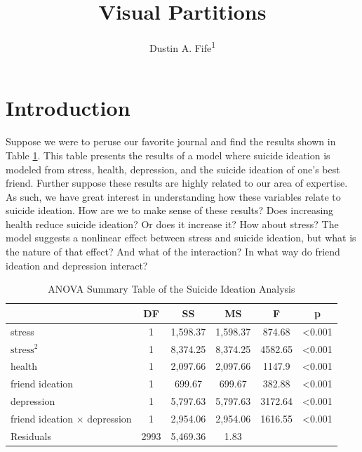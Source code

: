 \documentclass[
  man,floatsintext]{apa6}
\title{Visual Partitions}
\author{Dustin A. Fife\textsuperscript{1}}
\date{}
\affiliation{\vspace{0.5cm}\textsuperscript{1} Rowan University}
\begin{document}
\maketitle

\section{Introduction}\label{introduction}

Suppose we were to peruse our favorite journal and find the results shown in Table \ref{tab:anovatab}. This table presents the results of a model where suicide ideation is modeled from stress, health, depression, and the suicide ideation of one's best friend. Further suppose these results are highly related to our area of expertise. As such, we have great interest in understanding how these variables relate to suicide ideation. How are we to make sense of these results? Does increasing health reduce suicide ideation? Or does it increase it? How about stress? The model suggests a nonlinear effect between stress and suicide ideation, but what is the nature of that effect? And what of the interaction? In what way do friend ideation and depression interact?

\begin{table}[tbp]

\begin{center}
\begin{threeparttable}

\caption{\label{tab:anovatab}ANOVA Summary Table of the Suicide Ideation Analysis}

\begin{tabular}{lccccc}
\toprule
 & DF & SS & MS & F & p\\
\midrule
stress & 1 & 1,598.37 & 1,598.37 & 874.68 & <0.001\\
$\text{stress}^2$ & 1 & 8,374.25 & 8,374.25 & 4582.65 & <0.001\\
health & 1 & 2,097.66 & 2,097.66 & 1147.9 & <0.001\\
friend ideation & 1 & 699.67 & 699.67 & 382.88 & <0.001\\
depression & 1 & 5,797.63 & 5,797.63 & 3172.64 & <0.001\\
friend ideation $ \times $ depression & 1 & 2,954.06 & 2,954.06 & 1616.55 & <0.001\\
Residuals & 2993 & 5,469.36 & 1.83 &  & \\
\bottomrule
\end{tabular}

\end{threeparttable}
\end{center}

\end{table}
\end{document}
